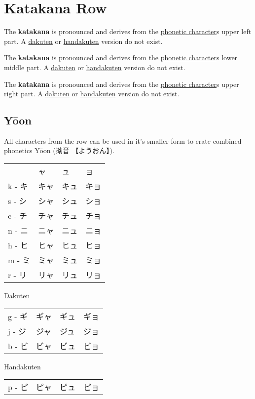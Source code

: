 \section{Katakana  Row}\label{sec:KatakanaYaRow}


 The  \textbf{katakana}  is pronounced  
and  derives from the \hyperref[sec:PhoneticCharacter]{phonetic character}s
 upper left part.  A \hyperref[sec:Dakuten]{dakuten} or
\hyperref[sec:Handakuten]{handakuten} version do not exist.

 The  \textbf{katakana}  is pronounced  
and  derives from the \hyperref[sec:PhoneticCharacter]{phonetic character}s
 lower middle part.  A \hyperref[sec:Dakuten]{dakuten} or
\hyperref[sec:Handakuten]{handakuten} version do not exist.

 The  \textbf{katakana}  is pronounced  
and  derives from the \hyperref[sec:PhoneticCharacter]{phonetic character}s
 upper right part.  A \hyperref[sec:Dakuten]{dakuten} or
\hyperref[sec:Handakuten]{handakuten} version do not exist.

\newpage
\subsection{Yōon}

All characters from the  row can be used in it's smaller form to crate
combined phonetics Yōon ({拗音} {【ようおん】}).

\begin{center} \Large
\begin{tabular}{llll}
      &ャ  &ュ  &ョ  \\
k - キ&キャ&キュ&キョ\\
s - シ&シャ&シュ&ショ\\
c - チ&チャ&チュ&チョ\\
n - ニ&ニャ&ニュ&ニョ\\
h - ヒ&ヒャ&ヒュ&ヒョ\\
m - ミ&ミャ&ミュ&ミョ\\
r - リ&リャ&リュ&リョ\\
\end{tabular}

Dakuten

\begin{tabular}{llll}
g - ギ&ギャ&ギュ&ギョ\\
j - ジ&ジャ&ジュ&ジョ\\
b - ビ&ビャ&ビュ&ビョ\\
\end{tabular}

Handakuten

\begin{tabular}{llll}
p - ピ&ピャ&ピュ&ピョ\\
\end{tabular}
\end{center}


